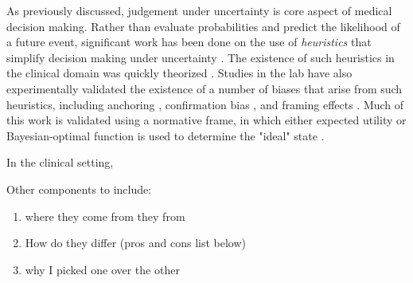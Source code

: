 As previously discussed, judgement under uncertainty is core aspect of medical decision making. Rather than evaluate probabilities and predict the likelihood of a future event, significant work has been done on the use of \emph{heuristics} that simplify decision making under uncertainty \citep{tverskyJudgmentUncertaintyHeuristics1974a}. The existence of such heuristics in the clinical domain was quickly theorized \cite{eddyProbabilisticReasoningClinical1982}. Studies in the lab have also experimentally validated the existence of a number of biases that arise from such heuristics, including anchoring \citep{friedlanderAnchoringPublicityEffects1983}, confirmation bias \citep{klaymanDebiasEnvironmentInstead1993}, and framing effects \citep{mcneilElicitationPreferencesAlternative1982}. Much of this work is validated using a normative frame, in which either expected utility or Bayesian-optimal function is used to determine the "ideal" state \citep{camererProcessperformanceParadoxExpert1991}. 

In the clinical setting, 



Other components to include: 

\begin{enumerate}
    \item where they come from they from
    \item How do they differ (pros and cons list below)
    \item why I picked one over the other
\end{enumerate}


